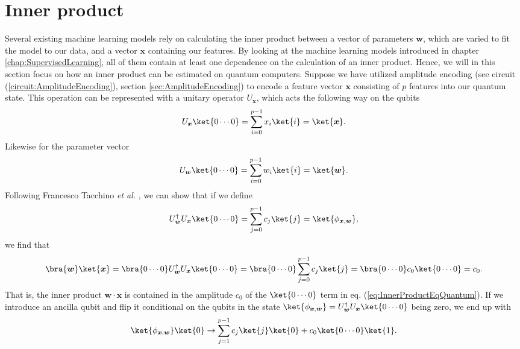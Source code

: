 \section{Inner product}
\label{sec:InnerProduct}
Several existing machine learning models rely on calculating the inner product between a vector of parameters $\boldsymbol{w}$, which are varied to fit the model to our data, and a vector $\boldsymbol{x}$ containing our features. By looking at the machine learning models introduced in chapter \ref{chap:SupervisedLearning}, all of them contain at least one dependence on the calculation of an inner product. Hence, we will in this section focus on how an inner product can be estimated on quantum computers. Suppose we have utilized amplitude encoding (see circuit (\ref{circuit:AmplitudeEncoding}), section \ref{sec:AmplitudeEncoding}) to encode a feature vector $\boldsymbol{x}$ consisting of $p$ features into our quantum state. This operation can be represented with a unitary operator $U_{\boldsymbol{x}}$, which acts the following way on the qubits
$$U_{\boldsymbol{x}}\ket{0\cdots 0} = \sum_{i=0}^{p-1} x_i\ket{i} = \ket{{\boldsymbol{x}}}.$$
Likewise for the parameter vector
$$U_{\boldsymbol{w}}\ket{0\cdots 0} = \sum_{i=0}^{p-1} w_i\ket{i} = \ket{{\boldsymbol{w}}}.$$
Following Francesco Tacchino \textit{et al.} \cite{InnerProductArtificialNeuron}, we can show that if we define
\begin{equation}
    \label{eq:InnerProductEqQuantum}
    U^\dagger_{\boldsymbol{w}} U_{\boldsymbol{x}}\ket{0 \cdots 0} = \sum_{j=0}^{p-1} c_j \ket{j} = \ket{\phi_{{\boldsymbol{x}},{\boldsymbol{w}}}},
\end{equation}
we find that
\begin{equation}
    \label{eq:SquaredInnerProdu}
    \bra{{\boldsymbol{w}}}\ket{{\boldsymbol{x}}} = \bra{0\cdots 0} U_{\boldsymbol{w}}^\dagger U_{\boldsymbol{x}} \ket{0\cdots 0} = \bra{0 \cdots 0} \sum_{j=0}^{p-1} c_j\ket{j} = \bra{0\cdots 0} c_0 \ket{0\cdots 0} = c_0.
\end{equation}
That is, the inner product $\boldsymbol{w} \cdot \boldsymbol{x}$ is contained in the amplitude $c_0$ of the $\ket{0\cdots 0 }$ term in eq. (\ref{eq:InnerProductEqQuantum}). If we introduce an ancilla qubit and flip it conditional on the qubits in the state $\ket{\phi_{{\boldsymbol{x}},{\boldsymbol{w}}}} = U^\dagger_{\boldsymbol{w}}U_{\boldsymbol{x}}\ket{0\cdots 0}$ being zero, we end up with
$$\ket{\phi_{{\boldsymbol{x}},{\boldsymbol{w}}}} \ket{0} \rightarrow \sum_{j=1}^{p-1}c_j \ket{j}\ket{0} + c_0 \ket{0\cdots 0} \ket{1}. $$
